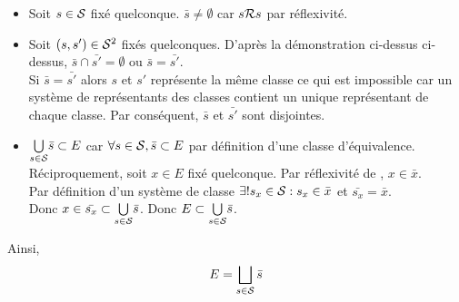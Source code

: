 \documentclass{article}
\renewenvironment{question_kholle}[2][ ]
{
	\subsection{\texorpdfstring{#2}{}}
	\notblank{#1}
	{
		\noindent #1
		\bigbreak
	}
	{}
	\begin{proof}
}
{
	\end{proof}
}
\begin{document}
\begin{question_kholle}
	\begin{itemize}[label=\textemdash]
		\item Soit $s\in \mathcal S$ fixé quelconque. $\bar{s} \neq \emptyset$ car $s \mathcal R s$ par réflexivité.
		\item Soit $(s, s') \in \mathcal S^2$ fixés quelconques. D'après la démonstration ci-dessus ci-dessus, $\bar{s} \cap \bar{s'} = \emptyset$ ou $\bar{s} = \bar{s'}$.\\
		      Si $\bar{s} = \bar{s'}$ alors $s$ et $s'$ représente la même classe ce qui est impossible car un système de représentants des classes contient un unique représentant de chaque classe. Par conséquent, $\bar{s}$ et $\bar{s'}$ sont disjointes.
		\item $\underset{s \in \mathcal S}{\bigcup} \bar{s} \subset E$ car $\forall s \in \mathcal S, \bar{s} \subset E$ par définition d'une classe d'équivalence. \\
		      Réciproquement, soit $x \in E$ fixé quelconque.
		      Par réflexivité de \Rel, $x \in \bar{x}$. \\
		      Par définition d'un système de classe $\exists ! s_x \in \mathcal S : s_x \in \bar{x}$ et $\bar{s_x} = \bar{x}$.\\
		      Donc $x \in \bar{s_x} \subset \underset{s \in \mathcal S}{\bigcup} \bar{s}$. Donc $E \subset \underset{s \in \mathcal S}{\bigcup} \bar{s}$.
	\end{itemize}

	Ainsi,
	$$E = \bigsqcup_{s \in \mathcal S} \bar{s}$$

\end{question_kholle}
\end{document}
